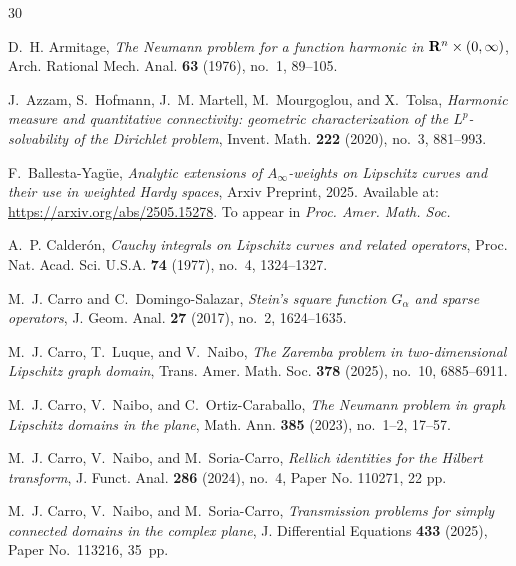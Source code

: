 \documentclass[12pt]{amsart}
\theoremstyle{plain}
\theoremstyle{definition}
\numberwithin{equation}{section}
\begin{document}
\begin{thebibliography}{30}

D.~H. Armitage,
\textit{The Neumann problem for a function harmonic in ${\bf R}^n \times (0,\infty)$},
Arch. Rational Mech. Anal. \textbf{63} (1976), no.~1, 89--105.




J.~Azzam, S.~Hofmann, J.~M. Martell, M.~Mourgoglou, and X.~Tolsa,
\textit{Harmonic measure and quantitative connectivity: geometric characterization of the \(L^p\)-solvability of the Dirichlet problem},
Invent. Math. \textbf{222} (2020), no.~3, 881--993.



F.~Ballesta-Yagüe,
\textit{Analytic extensions of $A_{\infty}$-weights on Lipschitz curves and their use in weighted Hardy spaces}, Arxiv Preprint, 2025. Available at: \url{https://arxiv.org/abs/2505.15278}. To appear in \textit{Proc. Amer. Math. Soc.} 



A.~P. Calderón,
\textit{Cauchy integrals on Lipschitz curves and related operators},
Proc. Nat. Acad. Sci. U.S.A. \textbf{74} (1977), no.~4, 1324--1327.




M.~J. Carro and C.~Domingo-Salazar,
\textit{Stein’s square function \(G_\alpha\) and sparse operators},
J. Geom. Anal. \textbf{27} (2017), no.~2, 1624--1635.




M.~J. Carro, T.~Luque, and V.~Naibo,
\textit{The Zaremba problem in two-dimensional Lipschitz graph domain}, Trans. Amer. Math. Soc. \textbf{378} (2025), no.~10, 6885--6911.





M.~J. Carro, V.~Naibo, and C.~Ortiz-Caraballo,
\textit{The Neumann problem in graph Lipschitz domains in the plane},
Math. Ann. \textbf{385} (2023), no.~1--2, 17--57.



M.~J. Carro, V.~Naibo, and M.~Soria-Carro,
\textit{Rellich identities for the Hilbert transform},
J. Funct. Anal. \textbf{286} (2024), no.~4, Paper No. 110271, 22 pp.



M.~J. Carro, V.~Naibo, and M.~Soria-Carro,
\textit{Transmission problems for simply connected domains in the complex plane}, J. Differential Equations \textbf{433} (2025), Paper No.~113216, 35~pp.






\end{thebibliography}
\end{document}
